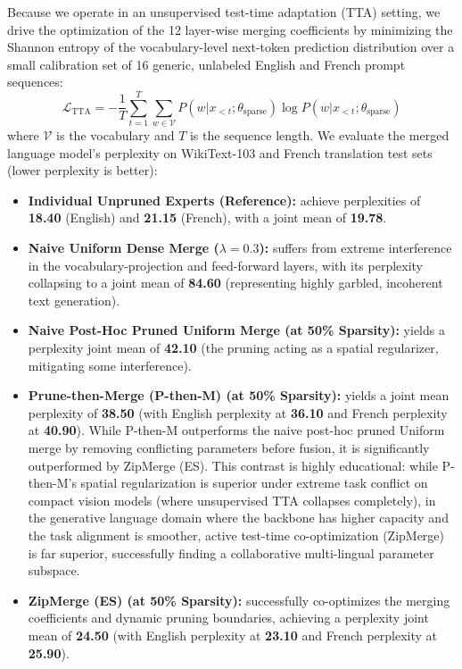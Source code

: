 Because we operate in an unsupervised test-time adaptation (TTA) setting, we drive the optimization of the 12 layer-wise merging coefficients by minimizing the Shannon entropy of the vocabulary-level next-token prediction distribution over a small calibration set of 16 generic, unlabeled English and French prompt sequences:
\begin{equation}
    \mathcal{L}_{\text{TTA}} = -\frac{1}{T}\sum_{t=1}^T \sum_{w \in \mathcal{V}} P(w | x_{<t}; \theta_{\text{sparse}}) \log P(w | x_{<t}; \theta_{\text{sparse}})
\end{equation}
where $\mathcal{V}$ is the vocabulary and $T$ is the sequence length. We evaluate the merged language model's perplexity on WikiText-103 and French translation test sets (lower perplexity is better):
\begin{itemize}[leftmargin=*]
    \item \textbf{Individual Unpruned Experts (Reference):} achieve perplexities of \textbf{18.40} (English) and \textbf{21.15} (French), with a joint mean of \textbf{19.78}.
    \item \textbf{Naive Uniform Dense Merge ($\lambda = 0.3$):} suffers from extreme interference in the vocabulary-projection and feed-forward layers, with its perplexity collapsing to a joint mean of \textbf{84.60} (representing highly garbled, incoherent text generation).
    \item \textbf{Naive Post-Hoc Pruned Uniform Merge (at 50\% Sparsity):} yields a perplexity joint mean of \textbf{42.10} (the pruning acting as a spatial regularizer, mitigating some interference).
    \item \textbf{Prune-then-Merge (P-then-M) (at 50\% Sparsity):} yields a joint mean perplexity of \textbf{38.50} (with English perplexity at \textbf{36.10} and French perplexity at \textbf{40.90}). While P-then-M outperforms the naive post-hoc pruned Uniform merge by removing conflicting parameters before fusion, it is significantly outperformed by ZipMerge (ES). This contrast is highly educational: while P-then-M's spatial regularization is superior under extreme task conflict on compact vision models (where unsupervised TTA collapses completely), in the generative language domain where the backbone has higher capacity and the task alignment is smoother, active test-time co-optimization (ZipMerge) is far superior, successfully finding a collaborative multi-lingual parameter subspace.
    \item \textbf{ZipMerge (ES) (at 50\% Sparsity):} successfully co-optimizes the merging coefficients and dynamic pruning boundaries, achieving a perplexity joint mean of \textbf{24.50} (with English perplexity at \textbf{23.10} and French perplexity at \textbf{25.90}).
\end{itemize}

